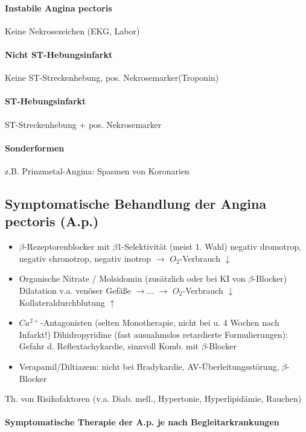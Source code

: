 \documentclass[10pt,a4paper]{report}
\begin{document}
\paragraph{Instabile Angina pectoris} Keine Nekrosezeichen (EKG, Labor)

\paragraph{Nicht ST-Hebungsinfarkt} Keine ST-Streckenhebung, pos. Nekrosemarker(Troponin)

\paragraph{ST-Hebungsinfarkt} ST-Streckenhebung + pos. Nekrosemarker

\paragraph{Sonderformen} z.B. Prinzmetal-Angina: Spasmen von Koronarien
\subsection{Symptomatische Behandlung der Angina pectoris (A.p.)}
\begin{itemize}
	\item $\beta$-Rezeptorenblocker mit $\beta$1-Selektivität (meist 1. Wahl) negativ dromotrop, negativ chronotrop, negativ inotrop $\rightarrow$ $O_2$-Verbrauch $\downarrow$
	\item Organische Nitrate / Molsidomin (zusätzlich oder bei KI von $\beta$-Blocker) Dilatation v.a. venöser Gefäße  $\rightarrow$... $\rightarrow$ $O_2$-Verbrauch $\downarrow$ Kollateraldurchblutung $\uparrow$
	\item $Ca^{2+}$-Antagonisten (selten Monotherapie, nicht bei u. 4 Wochen nach Infarkt!) Dihidropyridine (fast ausnahmslos retardierte Formulierungen): Gefahr d. Reflextachykardie, sinnvoll Komb. mit $\beta$-Blocker 
	\item Verapamil/Diltiazem: nicht bei Bradykardie, AV-Überleitungsstörung, $\beta$-Blocker 
\end{itemize}
Th. von Risikofaktoren (v.a. Diab. mell., Hypertonie, Hyperlipidämie, Rauchen) 

\paragraph{Symptomatische Therapie der A.p. je nach Begleitarkrankungen} \mbox{} \\
\end{document}
